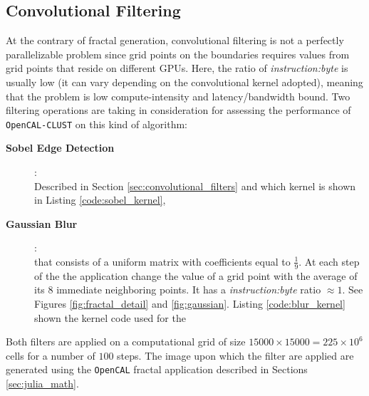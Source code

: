 \subsection{Convolutional Filtering}
\label{sec:sobel_performance}
At the contrary of fractal generation, convolutional filtering is not a perfectly parallelizable problem since grid points on the boundaries requires values from grid points that reside on different GPUs. Here, the ratio of \textit{instruction:byte} is usually low (it can vary depending on the convolutional kernel adopted), meaning that the problem is low compute-intensity and latency/bandwidth bound.
Two filtering operations are taking in consideration for assessing the performance of \texttt{OpenCAL-CLUST}  on this kind of algorithm:
\begin{description}
    \item[\textbf{Sobel Edge Detection}]:\\ Described in Section \ref{sec:convolutional_filters} and which kernel is shown in Listing \ref{code:sobel_kernel},
    \item[\textbf{Gaussian Blur}]:\\ that consists of a  uniform matrix  with coefficients equal to $\frac{1}{9}$. At each step of the the application change the value of a grid point with the average of its $8$ immediate neighboring points. It has a \textit{instruction:byte} ratio $\approx 1$. See Figures \ref{fig:fractal_detail} and \ref{fig:gaussian}. Listing \ref{code:blur_kernel} shown the kernel code used for the
\end{description}
Both filters are applied on a computational grid of size $15000 \times 15000=225 \times10^6$ cells for a number of $100$ steps. The image upon which the filter are applied are generated using the \texttt{OpenCAL} fractal application described in Sections \ref{sec:julia_math}.

